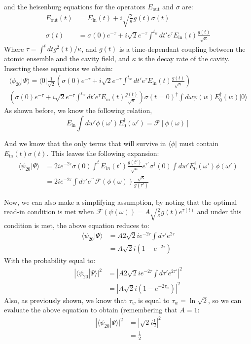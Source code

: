 \documentclass[12pt]{article}
\begin{document}
and the heisenburg equations for the operators $E_\textrm{out}$ and $\sigma$ are:
\begin{align}
E_\textrm{out}(t) &= E_\textrm{in}(t) + i \sqrt{\frac{2}{\kappa}} g(t) \sigma(t) \\
\sigma(t) &= \sigma(0) e^{-\tau} + i\sqrt{2} e^{-\tau} \int^{t_w} d t' e^\tau E_\textrm{in}(t) \frac{g(t)}{\sqrt{\kappa}}
\end{align}
Where $\tau = \int^t dt g^2(t)/\kappa$, and $g(t)$ is a time-dependant coupling between the atomic ensemble and the cavity field, and $\kappa$ is the decay rate of the cavity. Inserting these equations we obtain:
\begin{multline}
\langle \phi_{20}| \Psi \rangle =\langle 0 | \frac{1}{\sqrt{2}} \left (  \sigma(0) e^{-\tau} + i\sqrt{2} e^{-\tau} \int^{t_w} d t' e^\tau E_\textrm{in}(t) \frac{g(t)}{\sqrt{\kappa}} \right )\\ \left ( \sigma(0) e^{-\tau} + i\sqrt{2} e^{-\tau} \int^{t_w} d t' e^\tau E_\textrm{in}(t) \frac{g(t)}{\sqrt{\kappa}} \right ) \sigma(t=0)^\dagger \int d\omega \psi(w) E_0^\dagger(w) | 0 \rangle
\end{multline}
As shown before, we know the following relation,
\begin{equation}
E_\textrm{in} \int dw' \phi(\omega') E_0^\dagger(\omega') = \mathscr{F}[\phi(\omega)]
\end{equation}

And we know that the only terms that will survive in $\langle \phi |$ must contain $E_\textrm{in}(t) \sigma(t)$. This leaves the following expansion:
\begin{align}
\langle \psi_{20}| \Psi \rangle &= 2 i e^{-2\tau} \sigma(0) 
\int^{t} E_{in}(t') \frac{g(t')}{\sqrt{\kappa}} e^{\tau'} \sigma^\dagger(0) \int dw' E_0^\dagger(\omega') \phi(\omega')\\ 
&= 2 i e^{-2 \tau} \int d \tau' e^{\tau'} 
 \mathscr{F}(\phi(\omega)) \frac{\sqrt{\kappa}}{g(\tau')}
\end{align}

Now, we can also make a simplifying assumption, by noting that the optimal read-in condition is met when $\mathscr{F}(\psi(\omega)) =A \sqrt{\frac{2}{\kappa}} g(t) e^{\tau(t)}$ and under this condition is met, the above equation reduces to:
\begin{align}
\langle \psi_{20}| \Psi \rangle & =A 2\sqrt{2} i e^{-2\tau} \int d \tau' e^{2 \tau} \\
& =A \sqrt{2} i\left(1- e^{-2\tau}\right)
\end{align}
With the probability equal to:
\begin{align}
\label{p20}
|\langle \psi_{20}| \Psi \rangle|^2 &=|A 2\sqrt{2} i e^{-2\tau} \int d \tau' e^{2 \tau'}|^2 \\
&= |A  \sqrt{2} i (1-e^{-2\tau_w})|^2
\end{align}
Also, as previously shown, we know that $\tau_w$ is equal to $\tau_w = \ln{\sqrt{2}}$, so we can evaluate the above equation to obtain (remembering that $A = 1$:
\begin{align}
|\langle \psi_{20}| \Psi \rangle|^2 &= |\sqrt{2} i \frac{1}{2}|^2 \\
&= \frac{1}{2}
\end{align}
\end{document}
